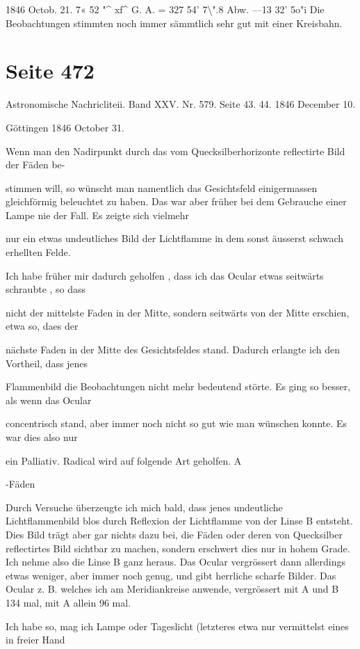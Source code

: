 \documentclass[10pt,a4paper]{article}
\begin{document}
1846 Octob. 21. 7« 52 "\textasciicircum{} xf\textasciicircum{} G. A. = 327\textdegree{} 54' 7\textbackslash{}".8 Abw. —13\textdegree{} 32' 5o"i Die Beobachtungen stimmten noch immer sämmtlich sehr gut mit einer Kreisbahn.


\newpage
\section*{Seite 472}
Astronomische Nachricliteii. Band XXV. Nr. 579. Seite 43. 44. 1846 December 10.

Göttingen 1846 October 31.

Wenn man den Nadirpunkt durch das vom Quecksilberhorizonte reflectirte Bild der Fäden be-

stimmen will, so wünscht man namentlich das Gesichtsfeld einigermassen gleichförmig beleuchtet zu haben. Das war aber früher bei dem Gebrauche einer Lampe nie der Fall. Es zeigte sich vielmehr

nur ein etwas undeutliches Bild der Lichtflamme in dem sonst äusserst schwach erhellten Felde.

Ich habe früher mir dadurch geholfen , dass ich das Ocular etwas seitwärts schraubte , so dass

nicht der mittelste Faden in der Mitte, sondern seitwärts von der Mitte erschien, etwa so, daes der

nächste Faden in der Mitte des Gesichtsfeldes stand. Dadurch erlangte ich den Vortheil, dass jenes

Flammenbild die Beobachtungen nicht mehr bedeutend störte. Es ging so besser, als wenn das Ocular

concentrisch stand, aber immer noch nicht so gut wie man wünschen konnte. Es war dies also nur

ein Palliativ. Radical wird auf folgende Art geholfen. A

-Fäden

Durch Versuche überzeugte ich mich bald, dass jenes undeutliche Lichtflammenbild blos durch Reflexion der Lichtflamme von der Linse B entsteht. Dies Bild trägt aber gar nichts dazu bei, die Fäden oder deren von Quecksilber reflectirtes Bild sichtbar zu machen, sondern erschwert dies nur in hohem Grade. Ich nehme also die Linse B ganz heraus. Das Ocular vergrössert dann allerdings etwas weniger, aber immer noch genug, und gibt herrliche scharfe Bilder. Das Ocular z. B. welches ich am Meridiankreise anwende, vergrössert mit A und B 134 mal, mit A allein 96 mal.

Ich habe so, mag ich Lampe oder Tageslicht (letzteres etwa nur vermittelst eines in freier Hand
\end{document}

